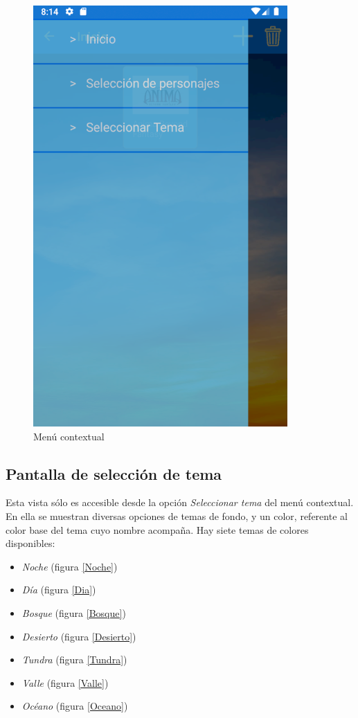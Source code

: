 \begin{figure}[H]
    \centering
    \includegraphics[scale=0.7]{Figures/Capturas/MenuContextual.png}
    \caption{Menú contextual}
    \label{MenuContextual}    
\end{figure}

\subsection{Pantalla de selección de tema}
Esta vista sólo es accesible desde la opción \textit{Seleccionar tema} del menú contextual.
En ella se muestran diversas opciones de temas de fondo, y un color, referente al color base del tema cuyo nombre acompaña.
Hay siete temas de colores disponibles: 
\begin{itemize}
    \item \textit{Noche} (figura \ref*{Noche})
    \item \textit{Día} (figura \ref*{Dia})
    \item \textit{Bosque} (figura \ref*{Bosque})
    \item \textit{Desierto} (figura \ref*{Desierto})
    \item \textit{Tundra} (figura \ref*{Tundra})
    \item \textit{Valle} (figura \ref*{Valle})
    \item \textit{Océano} (figura \ref*{Oceano})
\end{itemize}

